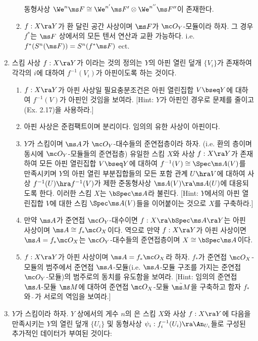 \begin{enumerate}[label=\tb{5.\arabic*.},itemindent=0mm,itemsep=2mm]
\begin{enumerate}[label=(\alph*)]
	동형사상 $\We^n\ms F\cong\We^{n'}\ms F'\otimes\We^{n''}\ms F''$이 존재한다.
	\item $f:X\ra Y$가 환 달린 공간 사상이며 $\ms F$가 $\mc O_Y$-모듈이라 하자.
	그 경우 $f^*$는 $\ms F$ 상에서의 모든 텐서 연산과 교환 가능하다.
	i.e. $f^*(S^n(\ms F))=S^n(f^*\ms F)$ ect.
	\end{enumerate}
	\item {} 스킴 사상 $f:X\ra Y$가 이라는 것의 정의는
	$Y$의 아핀 열린 덮개 $\{V_i\}$가 존재하여 각각의 $i$에 대하여 $f^{-1}(V_i)$가 아핀이도록 하는 것이다.
	\begin{enumerate}[label=(\alph*)]
	\item $f:X\ra Y$가 아핀 사상일 필요충분조건은  아핀 열린집합 $V\bseq Y$에 대하여 $f^{-1}(V)$가 아핀인 것임을 보여라.
	[Hint: $Y$가 아핀인 경우로 문제를 줄이고 (Ex. 2.17)을 사용하라.]
	\item 아핀 사상은 준컴팩트이며 분리이다. 임의의 유한 사상이 아핀이다.
	\item $Y$가 스킴이며 $\ms A$가 $\mc O_Y$-대수들의 준연접층이라 하자.
	(i.e. 환의 층이며 동시에 $\mc O_Y$-모듈들의 준연접층)
	유일한 스킴 $X$와 사상 $f:X\ra Y$가 존재하여 모든 아핀 열린집합 $V\bseq Y$에 대하여 $f^{-1}(V)\cong\Spec\ms A(V)$를 만족시키며
	$Y$의 아핀 열린 부분집합들의 모든 포함 관계 $U\hra V$에 대하여
	사상 $f^{-1}(U)\hra f^{-1}(V)$가 제한 준동형사상 $\ms A(V)\ra\ms A(U)$에 대응되도록 한다.
	이러한 스킴 $X$는 $\bSpec\ms A$라 불린다.
	[Hint: $Y$에서의 아핀 열린집합 $V$에 대한 스킴 $\Spec\ms A(V)$들을 이어붙이는 것으로 $X$를 구축하라.]
	\item 만약 $\ms A$가 준연접 $\mc O_Y$-대수이면 $f:X\ra\bSpec\ms A\ra Y$는 아핀 사상이며 $\ms A\cong f_*\mc O_X$이다.
	역으로 만약 $f:X\ra Y$가 아핀 사상이면 $\ms A=f_*\mc O_X$는 $\mc O_Y$-대수들의 준연접층이며 $X\cong\bSpec\ms A$이다.
	\item $f:X\ra Y$가 아핀 사상이며 $\ms A=f_*\mc O_X$라 하자. $f_*$가 준연접 $\mc O_X$-모듈의 범주에서
	준연접 $\ms A$-모듈(i.e. $\ms A$-모듈 구조를 가지는 준연접 $\mc O_Y$-모듈)의 범주로의 동치를 유도함을 보여라.
	[Hint: 임의의 준연접 $\ms A$-모듈 $\ms M$에 대하여 준연접 $\mc O_X$-모듈 $\tilde{\ms M}$을 구축하고
	함자 $f_*$와 $\tilde{\;}$가 서로의 역임을 보여라.]
	\end{enumerate}
	\item {} $Y$가 스킴이라 하자. $Y$ 상에서의 게수 $n$의 은
	스킴 $X$와 사상 $f:X\ra Y$에 다음을 만족시키는 $Y$의 열린 덮개 $\{U_i\}$ 및
	동형사상 $\psi_i:f_i^{-1}(U_i)\ra\An_{U_i}$들로 구성된 추가적인 데이터가 부여된 것이다:

\end{enumerate}
